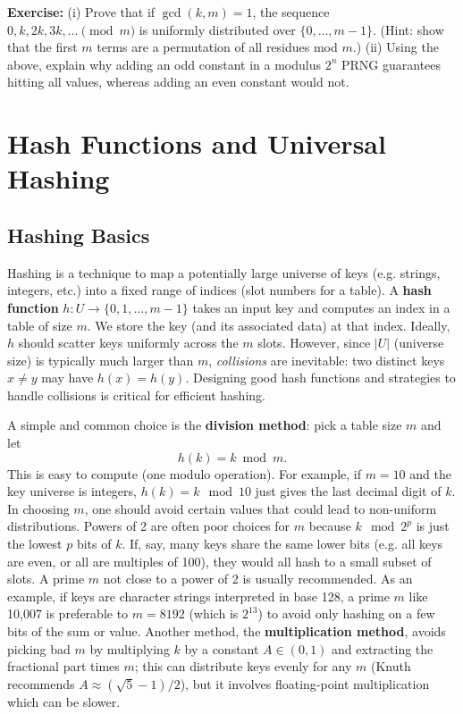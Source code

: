 \documentclass[11pt]{article}
\begin{document}
\textbf{Exercise:} (i) Prove that if $\gcd(k,m)=1$, the sequence $0, k, 2k, 3k, \ldots \pmod m$ is uniformly distributed over $\{0,\ldots,m-1\}$. (Hint: show that the first $m$ terms are a permutation of all residues mod $m$.) (ii) Using the above, explain why adding an odd constant in a modulus $2^n$ PRNG guarantees hitting all values, whereas adding an even constant would not.

\section{Hash Functions and Universal Hashing}
\label{sec:hashing}
\subsection{Hashing Basics}
Hashing is a technique to map a potentially large universe of keys (e.g. strings, integers, etc.) into a fixed range of indices (slot numbers for a table). A \textbf{hash function} $h: U \to \{0,1,\ldots, m-1\}$ takes an input key and computes an index in a table of size $m$. We store the key (and its associated data) at that index. Ideally, $h$ should scatter keys uniformly across the $m$ slots. However, since $|U|$ (universe size) is typically much larger than $m$, \emph{collisions} are inevitable: two distinct keys $x \neq y$ may have $h(x)=h(y)$. Designing good hash functions and strategies to handle collisions is critical for efficient hashing.

A simple and common choice is the \textbf{division method}: pick a table size $m$ and let 
\[ h(k) = k \bmod m. \] 
This is easy to compute (one modulo operation). For example, if $m=10$ and the key universe is integers, $h(k)=k \mod 10$ just gives the last decimal digit of $k$. In choosing $m$, one should avoid certain values that could lead to non-uniform distributions. Powers of 2 are often poor choices for $m$ because $k \mod 2^p$ is just the lowest $p$ bits of $k$. If, say, many keys share the same lower bits (e.g. all keys are even, or all are multiples of 100), they would all hash to a small subset of slots. A prime $m$ not close to a power of 2 is usually recommended. As an example, if keys are character strings interpreted in base 128, a prime $m$ like 10,007 is preferable to $m=8192$ (which is $2^{13}$) to avoid only hashing on a few bits of the sum or value. Another method, the \textbf{multiplication method}, avoids picking bad $m$ by multiplying $k$ by a constant $A \in (0,1)$ and extracting the fractional part times $m$; this can distribute keys evenly for any $m$ (Knuth recommends $A \approx (\sqrt{5}-1)/2$), but it involves floating-point multiplication which can be slower.
\end{document}
